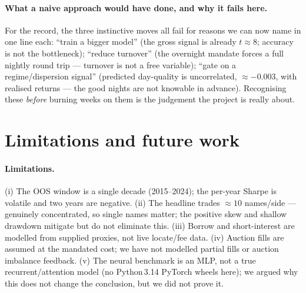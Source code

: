 \documentclass[11pt,a4paper]{article}
\newcommand{\edgeCorr}{-0.003}            %
\begin{document}
\paragraph{What a naive approach would have done, and why it fails here.} For the record, the three instinctive
moves all fail for reasons we can now name in one line each: ``train a bigger model'' (the gross signal is
already $t\approx8$; accuracy is not the bottleneck); ``reduce turnover'' (the overnight mandate forces a full
nightly round trip --- turnover is not a free variable); ``gate on a regime/dispersion signal'' (predicted
day-quality is uncorrelated, $\approx\edgeCorr$, with realised returns --- the good nights are not knowable in
advance). Recognising these \emph{before} burning weeks on them is the judgement the project is really about.

\section{Limitations and future work}\label{sec:future}
\paragraph{Limitations.} (i) The OOS window is a single decade (2015--2024); the per-year Sharpe is volatile and
two years are negative. (ii) The headline trades $\approx10$ names/side --- genuinely concentrated, so single
names matter; the positive skew and shallow drawdown mitigate but do not eliminate this. (iii) Borrow and
short-interest are modelled from supplied proxies, not live locate/fee data. (iv) Auction fills are assumed at
the mandated cost; we have not modelled partial fills or auction imbalance feedback. (v) The neural benchmark is
an MLP, not a true recurrent/attention model (no Python\,3.14 PyTorch wheels here); we argued why this does not
change the conclusion, but we did not prove it.
\end{document}
